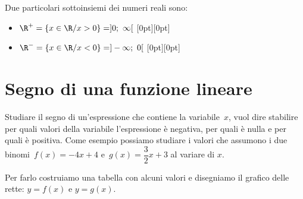\begin{esempio}{}{}
Due particolari sottoinsiemi dei numeri reali sono:

\begin{itemize} %
\item \(\R^{+}=\{x\in \R/x>0\} = ]0;~\infty[\) \hspace{15mm}
\raisebox{-9pt}[0pt][0pt]{} 
\item \(\R^{-}=\{x\in \R/x<0\} = ]- \infty;~0[\) \hspace{11mm}
\raisebox{-9pt}[0pt][0pt]{} 
\end{itemize}
\end{esempio}


\section{Segno di una funzione lineare}
\label{sec:dis_binomio}
Studiare il segno di un'espressione che contiene la variabile~\(x\), vuol 
dire stabilire per quali valori della variabile l'espressione è negativa, 
per quali è nulla  e per quali è positiva.
Come esempio possiamo studiare i valori che assumono i due 
binomi~\(f(x) = -4 x +4\) e~\(g(x) = \dfrac{3}{2} x +3\) al variare di 
\(x\).

Per farlo costruiamo una tabella con alcuni valori e disegniamo il grafico 
delle rette: \quad \(y=f(x)\) e \(y=g(x)\).


